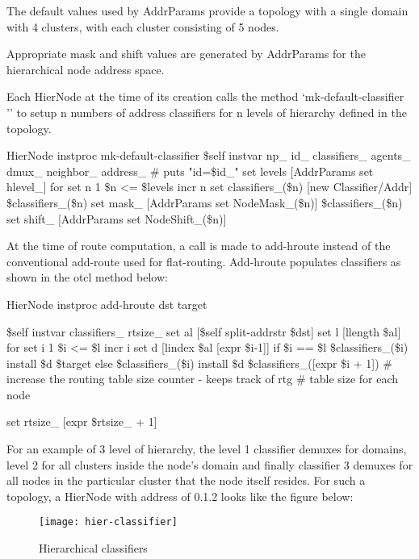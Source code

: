 The default values used by AddrParams provide a topology with a single
domain with 4 clusters, with each cluster consisting of 5 nodes.

Appropriate mask and shift values are generated by AddrParams for the
hierarchical node address space.

Each HierNode at the time of its creation calls the method
`mk-default-classifier '' to setup n numbers of address
classifiers for n levels of hierarchy defined in the topology.

\begin{program}
  HierNode instproc mk-default-classifier {} {
    \$self instvar np_ id_ classifiers_ agents_ dmux_ neighbor_ address_ 
    # puts "id=\$id_"
    set levels [AddrParams set hlevel_]
    for {set n 1} {\$n <= \$levels} {incr n} {
      set classifiers_(\$n) [new Classifier/Addr]
      \$classifiers_(\$n) set mask_ [AddrParams set NodeMask_(\$n)]
      \$classifiers_(\$n) set shift_ [AddrParams set NodeShift_(\$n)]
      }
    }
\end{program}

At the time of route computation, a call is made to add-hroute instead
of the conventional add-route used for flat-routing. Add-hroute
populates classifiers as shown in the otcl method below:

\begin{program}
HierNode instproc add-hroute { dst target } {
  \$self instvar classifiers_ rtsize_
  set al [\$self split-addrstr \$dst]
  set l [llength \$al] 
  for {set i 1} {\$i <= \$l} {incr i} {
    set d [lindex \$al [expr \$i-1]]
    if {\$i == \$l} {
      \$classifiers_(\$i) install \$d \$target
      } else {
      \$classifiers_(\$i) install \$d \$classifiers_([expr \$i + 1])
      }
    }
  # increase the routing table size counter - keeps track of rtg 
  # table size for each node
  
  set rtsize_ [expr \$rtsize_ + 1]
 }

\end{program}

For an example of 3 level of hierarchy, the level 1 classifier demuxes
for domains, level 2 for all clusters inside the node's domain and
finally classifier 3 demuxes for all nodes in the particular cluster
that the node itself resides. For such a topology, a HierNode with
address of 0.1.2 looks like the figure below:
\begin{figure}[tb]
\centerline{\texttt{[image: hier-classifier]}}
\caption{Hierarchical classifiers}
\label{fig:hier-classifier}
\end{figure}

